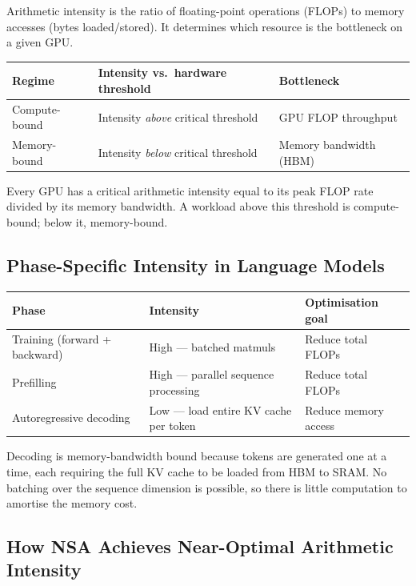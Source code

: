 \documentclass[11pt,letterpaper]{article}
\begin{document}
Arithmetic intensity is the ratio of floating-point operations (FLOPs) to memory accesses
(bytes loaded/stored). It determines which resource is the bottleneck on a given GPU.

\begin{center}\small
\renewcommand{\arraystretch}{1.3}
\begin{tabular}{@{}lll@{}}
\toprule
\textbf{Regime} & \textbf{Intensity vs.\ hardware threshold} & \textbf{Bottleneck} \\
\midrule
Compute-bound  & Intensity \emph{above} critical threshold & GPU FLOP throughput \\
Memory-bound   & Intensity \emph{below} critical threshold & Memory bandwidth (HBM) \\
\bottomrule
\end{tabular}
\end{center}

Every GPU has a critical arithmetic intensity equal to its peak FLOP rate divided by its memory
bandwidth. A workload above this threshold is compute-bound; below it, memory-bound.

\subsection{Phase-Specific Intensity in Language Models}

\begin{center}\small
\renewcommand{\arraystretch}{1.3}
\begin{tabular}{@{}lll@{}}
\toprule
\textbf{Phase} & \textbf{Intensity} & \textbf{Optimisation goal} \\
\midrule
Training (forward + backward) & High --- batched matmuls & Reduce total FLOPs \\
Prefilling                    & High --- parallel sequence processing & Reduce total FLOPs \\
Autoregressive decoding       & Low --- load entire KV cache per token & Reduce memory access \\
\bottomrule
\end{tabular}
\end{center}

Decoding is memory-bandwidth bound because tokens are generated one at a time, each requiring
the full KV cache to be loaded from HBM to SRAM. No batching over the sequence dimension is
possible, so there is little computation to amortise the memory cost.

\subsection{How NSA Achieves Near-Optimal Arithmetic Intensity}
\end{document}
